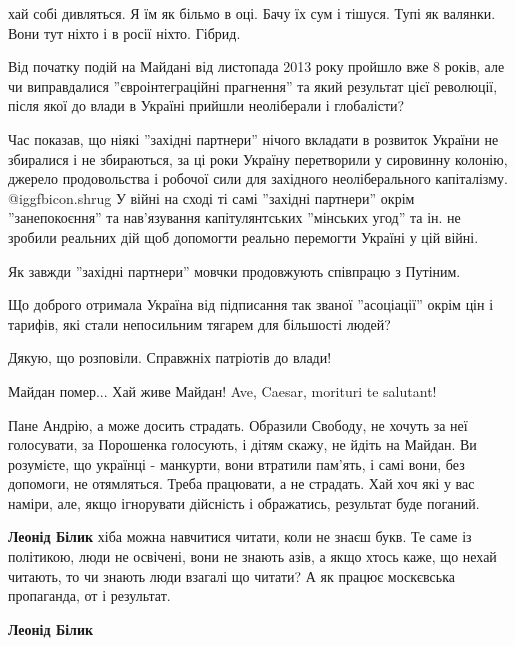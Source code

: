 \begin{itemize}
\begin{itemize}
хай собі дивляться. Я їм як більмо в оці. Бачу їх сум і тішуся. Тупі як
валянки. Вони тут ніхто і в росії ніхто. Гібрид.

\end{itemize} %


Від початку подій на Майдані від листопада 2013 року пройшло вже 8 років, але
чи виправдалися ''євроінтеграційні прагнення'' та який результат цієї
революції, після якої до влади в Україні прийшли неоліберали і глобалісти?

Час показав, що ніякі ''західні партнери'' нічого вкладати в розвиток України
не збиралися і не збираються, за ці роки Україну перетворили у сировинну
колонію, джерело продовольства і робочої сили для західного неоліберального
капіталізму. @igg{fbicon.shrug}  У війні на сході ті самі ''західні партнери'' окрім
''занепокоєння'' та нав'язування капітулянтських ''мінських угод'' та ін. не
зробили реальних дій щоб допомогти реально перемогти Україні у цій війні.

Як завжди ''західні партнери'' мовчки продовжують співпрацю з Путіним.

Що доброго отримала Україна від підписання так званої ''асоціації'' окрім цін і
тарифів, які стали непосильним тягарем для більшості людей?

Дякую, що розповіли. Справжніх патріотів до влади!

Майдан помер...
Хай живе Майдан!
Ave, Caesar, morituri te salutant!


Пане Андрію, а може досить страдать. Образили Свободу, не хочуть за неї
голосувати, за Порошенка голосують, і дітям скажу, не йдіть на Майдан. Ви
розумієте, що українці - манкурти, вони втратили пам'ять, і самі вони, без
допомоги, не отямляться. Треба працювати, а не страдать. Хай хоч які у вас
наміри, але, якщо ігнорувати дійсність і ображатись, результат буде поганий.

\begin{itemize} %
\textbf{Леонід Білик} хіба можна навчитися читати, коли не знаєш букв. Те саме із політикою, люди не освічені, вони не знають азів, а якщо хтось каже, що нехай читають, то чи знають люди взагалі що читати? А як працює москєвська пропаганда, от і результат.

\textbf{Леонід Білик} 


\end{itemize}
\end{itemize}
